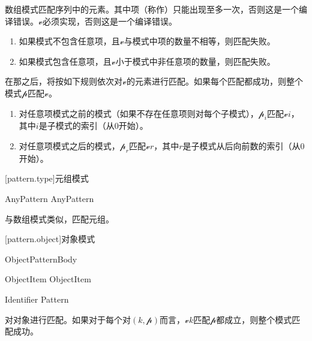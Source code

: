 \pnum
数组模式匹配序列中的元素。其中项（称作）只能出现至多一次，否则这是一个编译错误。$\mathcal{v}$必须实现，否则这是一个编译错误。

\begin{enumerate}
    \item 如果模式不包含任意项，且$\mathcal{v}$与模式中项的数量不相等，则匹配失败。
    \item 如果模式包含任意项，且$\mathcal{v}$小于模式中非任意项的数量，则匹配失败。
\end{enumerate}

\pnum
在那之后，将按如下规则依次对$\mathcal{v}$的元素进行匹配。如果每个匹配都成功，则整个模式$\mathcal{p}$匹配$\mathcal{v}$。

\begin{enumerate}
    \item 对任意项模式之前的模式（如果不存在任意项则对每个子模式），$\mathcal{p}_i$匹配$\mathcal{v}$\tcode{[}$i$\tcode{]}，其中$i$是子模式的索引（从0开始）。
    \item 对任意项模式之后的模式，$\mathcal{p}_r$匹配$\mathcal{v}$\tcode{[\$-}$r$\tcode{]}，其中$r$是子模式从后向前数的索引（从0开始）。
\end{enumerate}

[pattern.type]{元组模式}

\begin{bnf}
 \br
    \terminal{(} AnyPattern \bnflp\terminal{,} AnyPattern\bnfrp\bnfs\ \terminal{)}
\end{bnf}

\pnum
与数组模式类似，匹配元组。

[pattern.object]{对象模式}

\begin{bnf}
 \br
    \terminal{\{} ObjectPatternBody \terminal{\}}
\end{bnf}

\begin{bnf}
 \br
    ObjectItem \bnflp\terminal{,} ObjectItem\bnfrp\bnfs
\end{bnf}

\begin{bnf}
 \br
    Identifier \terminal{:} Pattern
\end{bnf}

\pnum
{}对对象进行匹配。如果对于每个对$(k, \mathcal{p})$而言，$\mathcal{v}$$k$匹配$\mathcal{p}$都成立，则整个模式匹配成功。


